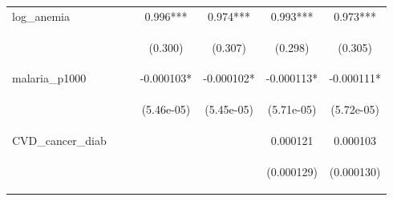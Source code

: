 \documentclass{article}
\begin{document}
\begin{table}[htbp]
{\begin{tabular}{lcccccc}
log\_anemia &  &  & 0.996*** & 0.974*** & 0.993*** & 0.973*** \\
\vspace{4pt} & \begin{footnotesize}\end{footnotesize} & \begin{footnotesize}\end{footnotesize} & \begin{footnotesize}(0.300)\end{footnotesize} & \begin{footnotesize}(0.307)\end{footnotesize} & \begin{footnotesize}(0.298)\end{footnotesize} & \begin{footnotesize}(0.305)\end{footnotesize} \\
malaria\_p1000 &  &  & -0.000103* & -0.000102* & -0.000113* & -0.000111* \\
\vspace{4pt} & \begin{footnotesize}\end{footnotesize} & \begin{footnotesize}\end{footnotesize} & \begin{footnotesize}(5.46e-05)\end{footnotesize} & \begin{footnotesize}(5.45e-05)\end{footnotesize} & \begin{footnotesize}(5.71e-05)\end{footnotesize} & \begin{footnotesize}(5.72e-05)\end{footnotesize} \\
CVD\_cancer\_diab &  &  &  &  & 0.000121 & 0.000103 \\
\vspace{4pt} & \begin{footnotesize}\end{footnotesize} & \begin{footnotesize}\end{footnotesize} & \begin{footnotesize}\end{footnotesize} & \begin{footnotesize}\end{footnotesize} & \begin{footnotesize}(0.000129)\end{footnotesize} & \begin{footnotesize}(0.000130)\end{footnotesize} \\

\end{tabular}}
\end{table}
\end{document}
